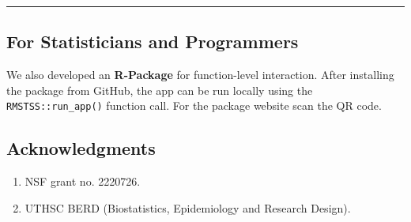 \documentclass[a0,landscape]{a0poster}
\begin{document}
\hfill

\rule{\linewidth}{1pt} %

\begin{minipage}[t]{0.5\linewidth}
    \subsection*{\Large For Statisticians and Programmers}
    \large We also developed an \textbf{R-Package} for function-level interaction. After installing the package from GitHub, the app can be run locally using the \verb|RMSTSS::run_app()| function call. For the package website scan the QR code.
\end{minipage}
\hfill
\begin{minipage} {0.2\linewidth}
\vspace{0.5cm}
    \begin{center}
    \end{center}
\end{minipage}
\hfill
\begin{minipage}[t]{0.25\linewidth}
    \subsection*{\Large Acknowledgments}
    \begin{enumerate}
        \item NSF grant no. 2220726.
        \item UTHSC BERD (Biostatistics, Epidemiology and Research Design).
    \end{enumerate}
\end{minipage}

\end{document}

